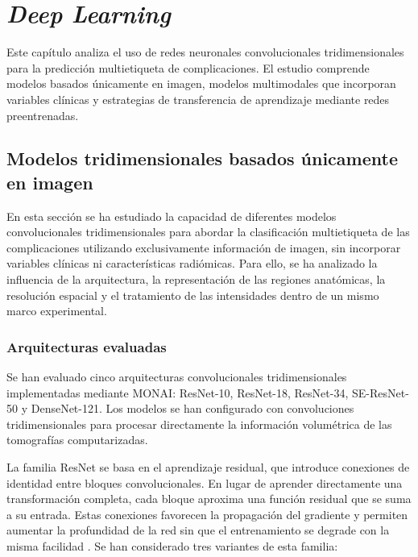 \chapter{\textit{Deep Learning}}\label{chap:DL}

Este capítulo analiza el uso de redes neuronales convolucionales tridimensionales para la predicción multietiqueta de complicaciones. El estudio comprende modelos basados únicamente en imagen, modelos multimodales que incorporan variables clínicas y estrategias de transferencia de aprendizaje mediante redes preentrenadas.

\section{Modelos tridimensionales basados únicamente en imagen} \label{sec:modelos-3d-solo-imagen}

En esta sección se ha estudiado la capacidad de diferentes modelos convolucionales tridimensionales para abordar la clasificación multietiqueta de las complicaciones utilizando exclusivamente información de imagen, sin incorporar variables clínicas ni características radiómicas. Para ello, se ha analizado la influencia de la arquitectura, la representación de las regiones anatómicas, la resolución espacial y el tratamiento de las intensidades dentro de un mismo marco experimental.

\subsection{Arquitecturas evaluadas}

Se han evaluado cinco arquitecturas convolucionales tridimensionales implementadas mediante MONAI: ResNet-10, ResNet-18, ResNet-34, SE-ResNet-50 y DenseNet-121. Los modelos se han configurado con convoluciones tridimensionales para procesar directamente la información volumétrica de las tomografías computarizadas.

La familia ResNet se basa en el aprendizaje residual, que introduce conexiones de identidad entre bloques convolucionales. En lugar de aprender directamente una transformación completa, cada bloque aproxima una función residual que se suma a su entrada. Estas conexiones favorecen la propagación del gradiente y permiten aumentar la profundidad de la red sin que el entrenamiento se degrade con la misma facilidad \cite{he2016deep}. Se han considerado tres variantes de esta familia:

